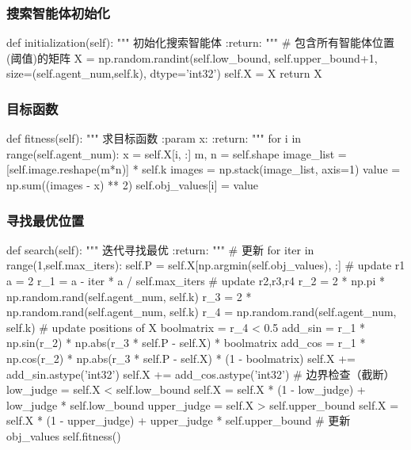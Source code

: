 \documentclass{article}
\begin{document}
\subsubsection{搜索智能体初始化}
\begin{python}
	def initialization(self):
		 """
		 初始化搜索智能体
		 :return:
		 """
		 # 包含所有智能体位置(阈值)的矩阵
		 X = np.random.randint(self.low_bound, self.upper_bound+1, size=(self.agent_num,self.k), dtype='int32')
		 self.X = X
		 return X
\end{python}
\subsubsection{目标函数}
\begin{python}
	def fitness(self):
		 """
		 求目标函数
		 :param x:
		 :return:
		 """
		 for i in range(self.agent_num):
		 	 x = self.X[i, :]
		 	 m, n = self.shape
		 	 image_list = [self.image.reshape(m*n)] * self.k
		 	 images = np.stack(image_list, axis=1)
		 	 value = np.sum((images - x) ** 2)
		 	 self.obj_values[i] = value
\end{python}
\subsubsection{寻找最优位置}
\begin{python}
	def search(self):
		 """
		 迭代寻找最优
		 :return:
		 """
		 # 更新
		 for iter in range(1,self.max_iters):
		 	 self.P = self.X[np.argmin(self.obj_values), :]
		 	 # update r1
		 	 a = 2
		 	 r_1 = a - iter * a / self.max_iters
		 	 # update r2,r3,r4
		 	 r_2 = 2 * np.pi * np.random.rand(self.agent_num, self.k)
		 	 r_3 = 2 * np.random.rand(self.agent_num, self.k)
		 	 r_4 = np.random.rand(self.agent_num, self.k)
		 	 # update positions of X
		 	 boolmatrix = r_4 < 0.5
		 	 add_sin = r_1 * np.sin(r_2) * np.abs(r_3 * self.P - self.X) * boolmatrix
		 	 add_cos = r_1 * np.cos(r_2) * np.abs(r_3 * self.P - self.X) * (1 - boolmatrix)
		 	 self.X += add_sin.astype('int32')
		 	 self.X += add_cos.astype('int32')
		 	 # 边界检查（截断）
		 	 low_judge = self.X < self.low_bound
		 	 self.X = self.X * (1 - low_judge) + low_judge * self.low_bound
		 	 upper_judge = self.X > self.upper_bound
		 	 self.X = self.X * (1 - upper_judge) + upper_judge * self.upper_bound
		 	 # 更新 obj_values
		 	 self.fitness()
\end{python}
\end{document}
